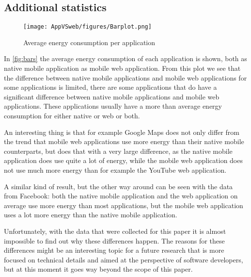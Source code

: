 \subsection{Additional statistics}
\begin{figure}[ht]
    \centering
    \texttt{[image: AppVSweb/figures/Barplot.png]}
    \caption{Average energy consumption per application}
    \label{fig:bars}
\end{figure}
In \autoref{fig:bars} the average energy consumption of each application is shown, both as native mobile application as mobile web application. From this plot we see that the difference between native mobile applications and mobile web applications for some applications is limited, there are some applications that do have a significant difference between native mobile applications and mobile web applications. These applications usually have a more than average energy consumption for either native or web or both.

An interesting thing is that for example Google Maps does not only differ from the trend that mobile web applications use more energy than their native mobile counterparts, but does that with a very large difference, as the native mobile application does use quite a lot of energy, while the mobile web application does not use much more energy than for example the YouTube web application. 

A similar kind of result, but the other way around can be seen with the data from Facebook: both the native mobile application and the web application on average use more energy than most applications, but the mobile web application uses a lot more energy than the native mobile application.

Unfortunately, with the data that were collected for this paper it is almost impossible to find out why these differences happen. The reasons for these differences might be an interesting topic for a future research that is more focused on technical details and aimed at the perspective of software developers, but at this moment it goes way beyond the scope of this paper.
